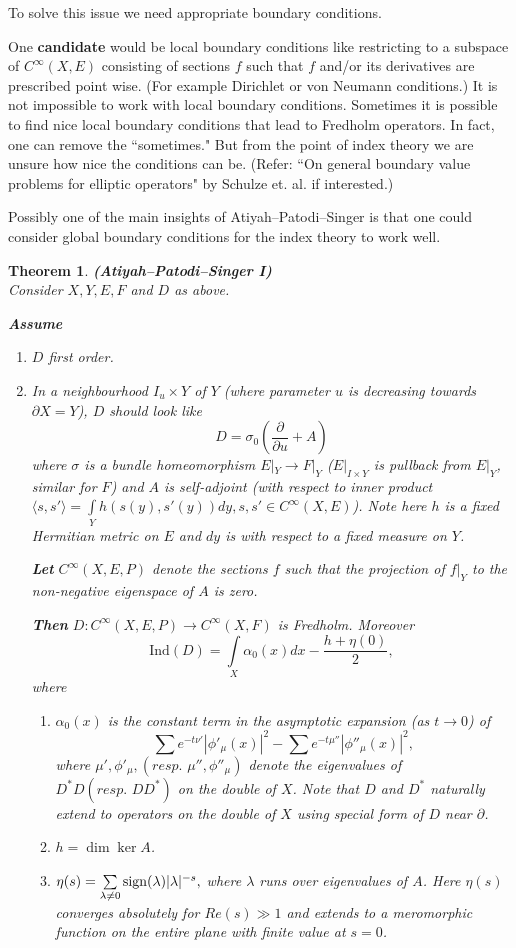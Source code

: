 \documentclass[11pt]{article}
\newcommand{\Ind}{\mathrm{Ind}}
\newcommand\inner[2]{\langle #1, #2 \rangle}
\newtheorem{thm}{Theorem}
\begin{document}
To solve this issue we need appropriate boundary conditions.

One {\bf candidate} would be local boundary conditions like restricting to a subspace of $C^\infty (X,E)$ consisting of sections $f$ such that $f$ and/or its derivatives are prescribed point wise. (For example Dirichlet or von Neumann conditions.) It is not impossible to work with local boundary conditions. Sometimes it is possible to find nice local boundary conditions that lead to Fredholm operators. In fact, one can remove the ``sometimes." But from the point of index theory we are unsure how nice the conditions can be. (Refer: ``On general boundary value problems for elliptic operators" by Schulze et. al. if interested.)

Possibly one of the main insights of Atiyah--Patodi--Singer is that one could consider global boundary conditions for the index theory to work well.

\begin{thm}{\bf(Atiyah--Patodi--Singer I)}\\
Consider $X, Y, E, F$ and $D$ as above.

{\bf Assume}
\begin{enumerate}
\item[a.] $D$ first order.
\item[b.] In a neighbourhood $I_u \times Y$ of $Y$ (where parameter $u$ is decreasing towards $\partial X = Y$), $D$ should look like
$$D = \sigma_0 (\frac{\partial}{\partial u } + A)$$ where $\sigma$ is a bundle homeomorphism $E|_Y \to F|_Y$ ($E|_{I \times Y}$ is pullback from $E|_Y$, similar for $F$) and $A$ is self-adjoint (with respect to inner product $\inner{s}{s'} = \int\limits_Y h(s(y), s'(y)) dy, s, s' \in C^\infty (X,E)$). Note here $h$ is a fixed Hermitian metric on $E$ and $dy$ is with respect to a fixed measure on $Y$.

{\bf Let} $C^\infty (X,E,P)$ denote the sections $f$ such that the projection of $f|_Y$ to the non-negative eigenspace of $A$ is zero.

{\bf Then} $D: C^\infty(X,E,P) \to C^\infty(X,F)$ is Fredholm.
Moreover
$$\Ind (D) = \int\limits_X \alpha_0(x) dx - \frac{h + \eta(0)}{2} ,$$
where
\begin{enumerate}
\item[(i)] $\alpha_0 (x)$ is the constant term in the asymptotic expansion (as $t \to 0$) of $$\sum e^{-t\nu'} |\phi'_\mu(x)|^2 - \sum e^{-t\mu''} |\phi''_\mu(x)|^2,$$
where $\mu', \phi'_\mu, (resp. \,\, \mu'', \phi''_\mu)$ denote the eigenvalues of $D^\ast D (resp. \,\, DD^\ast)$ on the double of $X$. Note that $D$ and $D^\ast$ naturally extend to operators on the double of $X$ using special form of $D$ near $\partial$.
\item[(ii)] $h = \dim \ker A$.
\item[(iii)] $\eta(s) = \sum\limits_{\lambda \neq 0} {\rm sign} (\lambda) |\lambda|^{-s},$ where $\lambda$ runs over eigenvalues of $A$. Here $\eta(s)$ converges absolutely for $Re(s) \gg 1$ and extends to a meromorphic function on the entire plane with finite value at $s=0$.
\end{enumerate}
\end{enumerate}
\end{thm}
\end{document}
